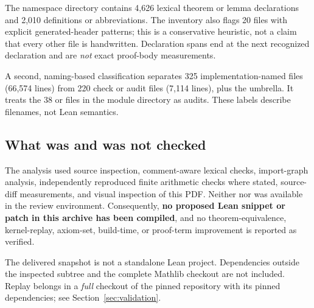 The namespace directory contains 4,626 lexical theorem or lemma declarations
and 2,010 definitions or abbreviations. The inventory also flags 20 files with
explicit generated-header patterns; this is a conservative heuristic, not a
claim that every other file is handwritten. Declaration spans end at the next
recognized declaration and are \emph{not} exact proof-body measurements.

A second, naming-based classification separates 325 implementation-named
files (66,574 lines) from 220 check or audit files (7,114 lines), plus the
umbrella. It treats the 38  or  files in the module
directory as audits. These labels describe filenames, not Lean semantics.

\subsection{What was and was not checked}

The analysis used source inspection, comment-aware lexical checks, import-graph
analysis, independently reproduced finite arithmetic checks where stated,
source-diff measurements, and visual inspection of this PDF. Neither
 nor  was available in the review environment. Consequently,
\textbf{no proposed Lean snippet or patch in this archive has been compiled},
and no theorem-equivalence, kernel-replay, axiom-set, build-time, or proof-term
improvement is reported as verified.

The delivered snapshot is not a standalone Lean project. Dependencies outside
the inspected subtree and the complete Mathlib checkout are not included.
Replay belongs in a \emph{full} checkout of the pinned repository with its
pinned dependencies; see Section~\ref{sec:validation}.

